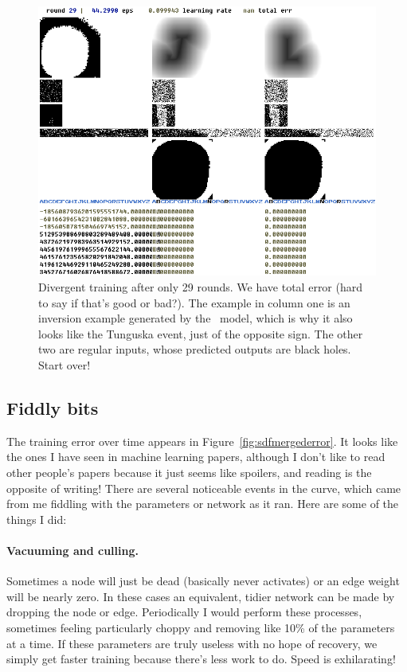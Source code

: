 \documentclass[twocolumn]{article}
\begin{document}
\begin{figure}[ht]
\centering
  \includegraphics[width=0.9 \linewidth]{nans}
\caption{ Divergent training after only 29 rounds. We have \nan{}
  total error (hard to say if that's good or bad?). The example in
  column one is an inversion example generated by the
  \makeuppercase\ model, which is why it also looks like the Tunguska
  event, just of the opposite sign. The other two are regular inputs,
  whose predicted outputs are black holes. Start over!
} \label{fig:nans}
\end{figure}


\subsection{Fiddly bits} \label{sec:fiddly}
The training error over time appears in
Figure~\ref{fig:sdfmergederror}. It looks like the ones I have seen in
machine learning papers, although I don't like to read other people's
papers because it just seems like spoilers, and reading is the
opposite of writing! There are several noticeable events in the curve,
which came from me fiddling with the parameters or network as it ran.
Here are some of the things I did:

\paragraph{Vacuuming and culling.} Sometimes a node will just be
dead (basically never activates) or an edge weight will be nearly
zero. In these cases an equivalent, tidier network can be made by
dropping the node or edge. Periodically I would perform these
processes, sometimes feeling particularly choppy and removing like
10\% of the parameters at a time. If these parameters are truly
useless with no hope of recovery, we simply get faster training
because there's less work to do. Speed is exhilarating!
\end{document}
